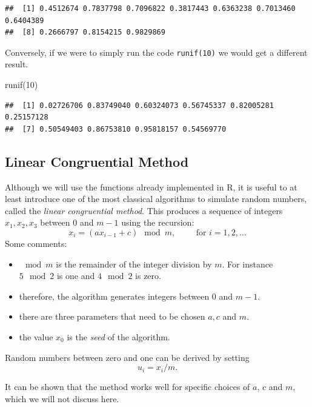 \documentclass[
]{book}
\newenvironment{Shaded}{\begin{snugshade}}{\end{snugshade}}
\newcommand{\DecValTok}[1]{\textcolor[rgb]{0.00,0.00,0.81}{#1}}
\newcommand{\FunctionTok}[1]{\textcolor[rgb]{0.00,0.00,0.00}{#1}}
\newcommand{\NormalTok}[1]{#1}
\theoremstyle{definition}
\theoremstyle{definition}
\theoremstyle{definition}
\theoremstyle{definition}
\theoremstyle{remark}
\begin{document}
\begin{verbatim}
##  [1] 0.4512674 0.7837798 0.7096822 0.3817443 0.6363238 0.7013460 0.6404389
##  [8] 0.2666797 0.8154215 0.9829869
\end{verbatim}

Conversely, if we were to simply run the code \texttt{runif(10)} we would get a different result.

\begin{Shaded}
\begin{Highlighting}[]
\FunctionTok{runif}\NormalTok{(}\DecValTok{10}\NormalTok{)}
\end{Highlighting}
\end{Shaded}

\begin{verbatim}
##  [1] 0.02726706 0.83749040 0.60324073 0.56745337 0.82005281 0.25157128
##  [7] 0.50549403 0.86753810 0.95818157 0.54569770
\end{verbatim}

\hypertarget{linear-congruential-method}{%
\subsection{Linear Congruential Method}\label{linear-congruential-method}}

Although we will use the functions already implemented in R, it is useful to at least introduce one of the most classical algorithms to simulate random numbers, called the \emph{linear congruential method}.
This produces a sequence of integers \(x_1,x_2,x_3\) between 0 and \(m-1\) using the recursion:
\[
x_{i}=(ax_{i-1}+c)\mod m, \hspace{1cm} \mbox{for } i = 1,2,\dots
\]
Some comments:

\begin{itemize}
\item
  \(\mod m\) is the remainder of the integer division by \(m\). For instance \(5 \mod 2\) is one and \(4\mod 2\) is zero.
\item
  therefore, the algorithm generates integers between 0 and \(m-1\).
\item
  there are three parameters that need to be chosen \(a, c\) and \(m\).
\item
  the value \(x_0\) is the \emph{seed} of the algorithm.
\end{itemize}

Random numbers between zero and one can be derived by setting
\[
u_i= x_i/m.
\]

It can be shown that the method works well for specific choices of \(a\), \(c\) and \(m\), which we will not discuss here.
\end{document}

